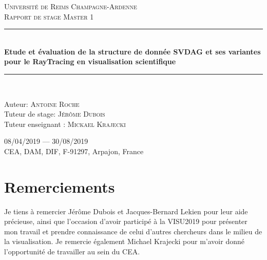 \documentclass[12pt,a4paper,twoside]{article}
\newcommand{\HRule}{\rule{\linewidth}{0.5mm}}
\begin{document}
\begin{titlepage}
\begin{sffamily}
\begin{center}
\begin{figure}[h]
\begin{minipage}[c]{.46\linewidth}
                    \end{minipage}
                \end{figure}
                \vspace{2cm}
                \textsc{\LARGE Université de Reims Champagne-Ardenne}\\[2cm]
                \textsc{\Large Rapport de stage Master 1}\\[1.5cm]
                \HRule \\[1cm]
                { \Large \bfseries Etude et évaluation de la structure de donnée SVDAG et ses variantes pour le RayTracing en visualisation scientifique \\[0.4cm] }
                \HRule \\[2cm]


                \begin{minipage}{0.8\textwidth}
                    \begin{flushleft}
                        \Large Auteur: \textsc{Antoine Roche}\\
                        Tuteur de stage: \textsc{Jérôme Dubois}\\
                        Tuteur enseignant : \textsc{Mickael Krajecki}\\
                    \end{flushleft}
                \end{minipage}

                \vfill
                \Large 08/04/2019 — 30/08/2019 \\[1cm]
                \Huge {CEA, DAM, DIF, F-91297, Arpajon, France}

            \end{center}
        \end{sffamily}
    \end{titlepage}

\newpage
    \section*{Remerciements}

    Je tiens à remercier Jérôme Dubois et Jacques-Bernard Lekien pour leur aide précieuse, ainsi que l'occasion d'avoir participé
    à la VISU2019 pour présenter mon travail et prendre connaissance de celui d'autres chercheurs dans le milieu de la visualisation.
    Je remercie également Michael Krajecki pour m'avoir donné l'opportunité de travailler au sein du CEA.
\end{document}
